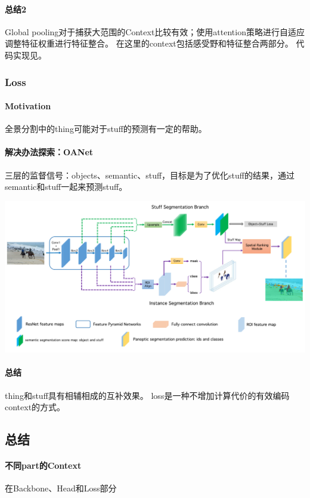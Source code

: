 \documentclass[UTF8, a4paper]{ctexart}
\begin{document}
\paragraph{总结2}
Global pooling对于捕获大范围的Context比较有效；使用attention策略进行自适应调整特征权重进行特征整合。
在这里的context包括感受野和特征整合两部分。
代码实现见\cite{torchseg_code}。

\subsubsection{Loss}

\paragraph{Motivation}
全景分割中的thing可能对于stuff的预测有一定的帮助。

\paragraph{解决办法探索：OANet\cite{Panoptic_Megvii}}

三层的监督信号：objects、semantic、stuff，目标是为了优化stuff的结果，通过semantic和stuff一起来预测stuff。

{\includegraphics[width=0.95\linewidth]{OANet-network}}

\paragraph{总结}
thing和stuff具有相辅相成的互补效果。
loss是一种不增加计算代价的有效编码context的方式。

\subsection{总结}
\paragraph{不同part的Context} 在Backbone、Head和Loss部分
\end{document}
